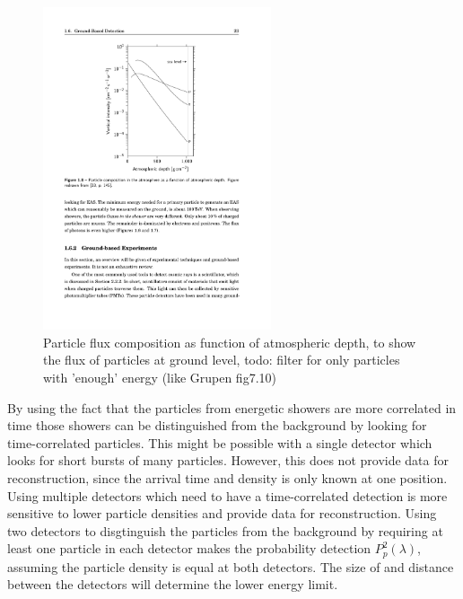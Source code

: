 \begin{figure}
    \centering
    \includegraphics[width=0.6\textwidth]
                    {plots/experiment/particle_density}
    \caption{Particle flux composition as function of atmospheric depth, to show the flux of particles at ground level, todo: filter for only particles with 'enough' energy (like Grupen fig7.10)}
    \label{fig:particle_density}
\end{figure}

By using the fact that the particles from energetic showers are more correlated in time those showers can be distinguished from the background by looking for time-correlated particles. This might be possible with a single detector which looks for short bursts of many particles. However, this does not provide data for reconstruction, since the arrival time and density is only known at one position. Using multiple detectors which need to have a time-correlated detection is more sensitive to lower particle densities and provide data for reconstruction. Using two detectors to disgtinguish the particles from the background by requiring at least one particle in each detector makes the probability detection $P_p^2(\lambda)$, assuming the particle density is equal at both detectors. The size of and distance between the detectors will determine the lower energy limit.

